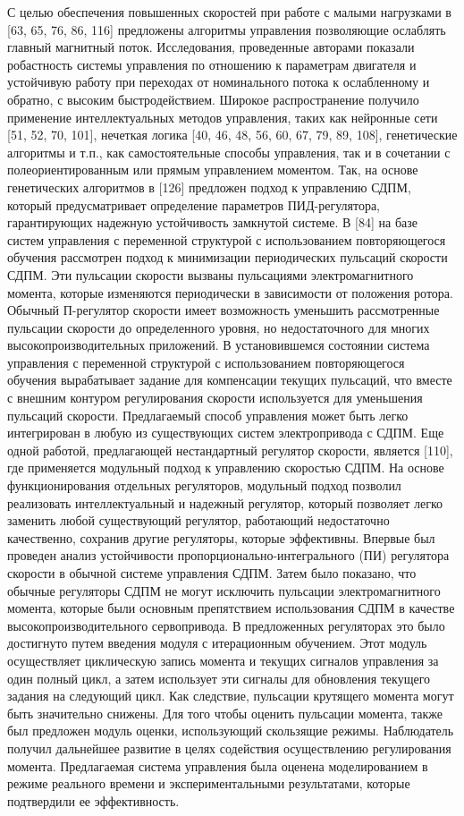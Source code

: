 С целью обеспечения повышенных скоростей при работе с малыми нагрузками в [63, 65, 76, 86, 116] предложены алгоритмы управления позволяющие ослаблять главный магнитный поток. Исследования, проведенные авторами показали робастность системы управления по отношению к параметрам двигателя и устойчивую работу при переходах от номинального потока к ослабленному и обратно, с высоким быстродействием. 
Широкое распространение получило применение интеллектуальных методов управления, таких как нейронные сети [51, 52, 70, 101], нечеткая логика [40, 46, 48, 56, 60, 67, 79, 89, 108], генетические алгоритмы и т.п., как самостоятельные способы управления, так и в сочетании с полеориентированным или прямым управлением моментом.
Так, на основе генетических алгоритмов в [126] предложен подход к управлению СДПМ, который предусматривает определение параметров ПИД-регулятора, гарантирующих надежную устойчивость замкнутой системе. 
В [84] на базе систем управления с переменной структурой с использованием повторяющегося обучения рассмотрен подход к минимизации периодических пульсаций скорости СДПМ. Эти пульсации скорости вызваны пульсациями электромагнитного момента, которые изменяются периодически в зависимости от положения ротора. Обычный П-регулятор скорости имеет возможность уменьшить рассмотренные пульсации скорости до определенного уровня, но недостаточного для многих высокопроизводительных приложений. В установившемся состоянии система управления с переменной структурой с использованием повторяющегося обучения вырабатывает задание для компенсации текущих пульсаций, что вместе с внешним контуром регулирования скорости используется для уменьшения пульсаций скорости. Предлагаемый способ управления может быть легко интегрирован в любую из существующих систем электропривода с СДПМ. 
Еще одной работой, предлагающей нестандартный регулятор скорости, является [110], где применяется модульный подход к управлению скоростью СДПМ. На основе функционирования отдельных регуляторов, модульный подход позволил реализовать интеллектуальный и надежный регулятор, который позволяет легко заменить любой существующий регулятор, работающий недостаточно качественно, сохранив другие регуляторы, которые эффективны. Впервые был проведен анализ устойчивости пропорционально-интегрального (ПИ) регулятора скорости в обычной системе управления СДПМ. Затем было показано, что обычные регуляторы СДПМ не могут исключить пульсации электромагнитного момента, которые были основным препятствием использования СДПМ в качестве высокопроизводительного сервопривода. В предложенных регуляторах это было достигнуто путем введения модуля с итерационным обучением. Этот модуль осуществляет циклическую запись момента и текущих сигналов управления за один полный цикл, а затем использует эти сигналы для обновления текущего задания на следующий цикл. Как следствие, пульсации крутящего момента могут быть значительно снижены. Для того чтобы оценить пульсации момента, также был предложен модуль оценки, использующий скользящие режимы. Наблюдатель получил дальнейшее развитие в целях содействия осуществлению регулирования момента. Предлагаемая система управления была оценена моделированием в режиме реального времени и экспериментальными результатами, которые подтвердили ее эффективность.
